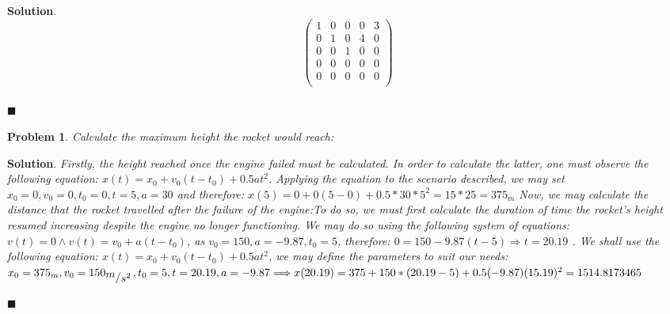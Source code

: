 \documentclass[12pt]{article}
\newcommand{\bigslant}[2]{{\raisebox{.2em}{$#1$}\left/\raisebox{-.2em}{$#2$}\right.}} %
\renewcommand{\=}[1]{\stackrel{#1}{=}} %
\newtheorem{p}{Problem}[section]
\theoremstyle{definition}
\newenvironment{s}{%
        \begin{trivlist} \item \textbf{Solution}. }{%
            \hspace*{\fill} $\blacksquare$\end{trivlist}}%
\begin{document}
\begin{s}
  \[
    \begin{pmatrix}
      1 & 0 & 0 & 0 & 3 \\
      0 & 1 & 0 & 4  & 0 \\
      0 & 0 & 1 & 0 & 0  \\
      0 & 0 & 0 & 0  & 0  \\
      0 & 0 & 0 & 0  & 0 \\
    \end{pmatrix}
  \]
  \\
\end{s}
\begin{p}
  \emph{Calculate the maximum height the rocket would reach:}
\end{p}
\begin{s} \newline
  \emph{Firstly, the height reached once the engine failed must be calculated. In order to calculate the latter, one must observe the following equation: $x(t) = x_0 + v_0(t - t_0) + 0.5at^2$. Applying the equation to the scenario described, we may set $x_0 = 0, v_0 = 0, t_0 = 0, t = 5, a = 30$ and therefore: $x(5) = 0 + 0(5 - 0) + 0.5 * 30 * 5^2 = 15 * 25 = 375_{m}$ \newline Now, we may calculate the distance that the rocket travelled after the failure of the engine:\newline To do so, we must first calculate the duration of time the rocket's height resumed increasing despite the engine no longer functioning. \newline We may do so using the following system of equations: $v(t) = 0 \wedge v(t) = v_0 + a(t - t_0)$, as $v_0 = 150, a = -9.87, t_0 = 5$, therefore: $0 = 150 - 9.87(t - 5) \Longrightarrow t = 20.19$ \newline. We shall use the following equation: $x(t) = x_0 + v_0(t - t_0) + 0.5at^{2}$, we may define the parameters to suit our needs: $x_0 = 375_m, v_0 = 150_{\bigslant{m}{s^{2}}}, t_0 = 5, t = 20.19, a = -9.87 \Longrightarrow x(20.19) = 375 + 150 * (20.19 - 5) + 0.5(-9.87)(15.19)^2 = 1514.8173465$}

\end{s}
\end{document}
